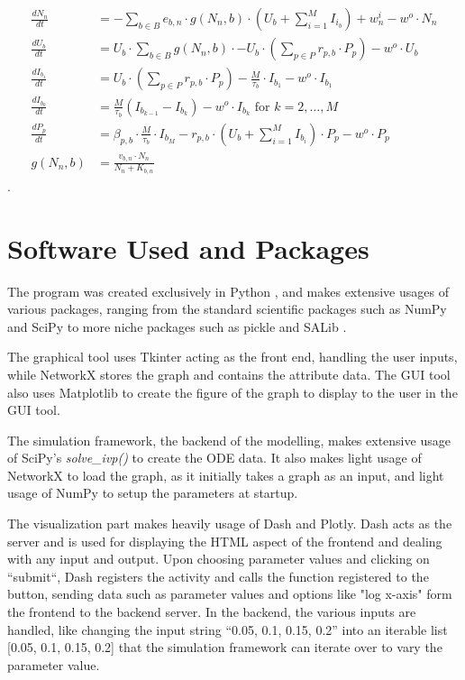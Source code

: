 \begin{align}
    \frac{dN_n}{dt} &= -\sum_{b \in B} e_{b, n} \cdot g(N_n, b)\cdot (U_b + \sum_{i=1}^{M} I_{i_b}) + w^i_n - w^o \cdot N_n\\
    \frac{dU_b}{dt} &= U_b \cdot \sum_{b \in B} g(N_n, b)\cdot - U_b \cdot (\sum_{p \in P} r_{p, b} \cdot P_p) - w^o \cdot U_b\\
    \frac{dI_{b_1}}{dt} &= U_b \cdot (\sum_{p \in P}r_{p, b} \cdot P_p) - \frac{M}{\tau_b}\cdot I_{b_1} - w^o \cdot I_{b_1}\\
    \frac{dI_{b_k}}{dt} &= \frac{M}{\tau_b}(I_{b_{k-1}}-I_{b_k}) - w^o \cdot I_{b_k}\text{ for } k=2, \dots, M \\
    \frac{dP_p}{dt} &= \beta_{p, b}\cdot\frac{M}{\tau_b} \cdot I_{b_M} - r_{p, b}\cdot(U_b + \sum_{i=1}^{M} I_{b_i})\cdot P_p - w^o \cdot P_p\\
    g(N_n, b) &= \frac{v_{b, n} \cdot N_n}{N_n + K_{b, n}}
\end{align}. 


\section{Software Used and Packages}
The program was created exclusively in Python \cite{Python}, and makes extensive usages of various packages, ranging from the standard scientific packages such as NumPy \cite{NumPy} and SciPy to more niche packages such as pickle and SALib \cite{iwanagaSALib20Advancing2022, hermanSALibOpensourcePython2017}.

The graphical tool uses Tkinter acting as the front end, handling the user inputs, while NetworkX \cite{hagbergExploringNetworkStructure2008} stores the graph and contains the attribute data. 
The GUI tool also uses Matplotlib \cite{Matplotlib}to create the figure of the graph to display to the user in the GUI tool.

The simulation framework, the backend of the modelling, makes extensive usage of SciPy's \textit{solve\_ivp()} to create the ODE data. 
It also makes light usage of NetworkX to load the graph, as it initially takes a graph as an input, and light usage of NumPy to setup the parameters at startup. 

The visualization part makes heavily usage of Dash and Plotly. 
Dash acts as the server and is used for displaying the HTML aspect of the frontend and dealing with any input and output. 
Upon choosing parameter values and clicking on “submit“, Dash registers the activity and calls the function registered to the button, sending data such as parameter values and options like "log x-axis" form the frontend to the backend server. 
In the backend, the various inputs are handled, like changing the input string “0.05, 0.1, 0.15, 0.2” into an iterable list [0.05, 0.1, 0.15, 0.2] that the simulation framework can iterate over to vary the parameter value. 

